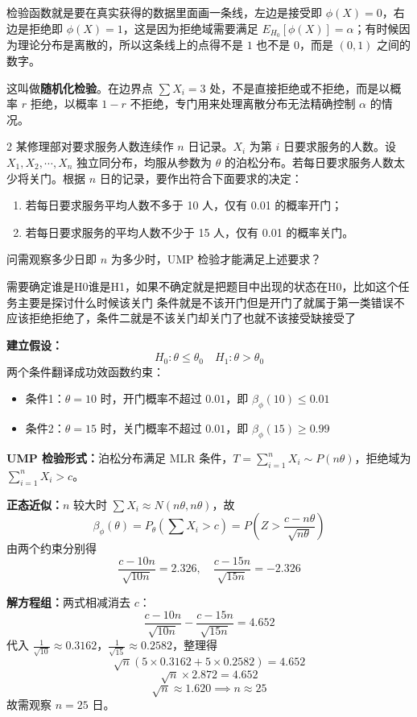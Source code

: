\begin{dxtips}
    检验函数就是要在真实获得的数据里面画一条线，左边是接受即 $\phi(X)=0$，右边是拒绝即 $\phi(X)=1$，这是因为拒绝域需要满足 $E_{H_0}[\phi(X)]=\alpha$；有时候因为理论分布是离散的，所以这条线上的点得不是 $1$ 也不是 $0$，而是 $(0,1)$ 之间的数字。
\end{dxtips}
\begin{dxtips}
    这叫做\textbf{随机化检验}。在边界点 $\sum X_i = 3$ 处，不是直接拒绝或不拒绝，而是以概率 $r$ 拒绝，以概率 $1-r$ 不拒绝，专门用来处理离散分布无法精确控制 $\alpha$ 的情况。
\end{dxtips}
\begin{homework}{2}
某修理部对要求服务人数连续作 $n$ 日记录。$X_i$ 为第 $i$ 日要求服务的人数。设 $X_1, X_2, \cdots, X_n$ 独立同分布，均服从参数为 $\theta$ 的泊松分布。若每日要求服务人数太少将关门。根据 $n$ 日的记录，要作出符合下面要求的决定：
\begin{enumerate}
    \item 若每日要求服务平均人数不多于 10 人，仅有 0.01 的概率开门；
    \item 若每日要求服务的平均人数不少于 15 人，仅有 0.01 的概率关门。
\end{enumerate}
问需观察多少日即 $n$ 为多少时，UMP 检验才能满足上述要求？
\end{homework}
\begin{dxtips}
    需要确定谁是H0谁是H1，如果不确定就是把题目中出现的状态在H0，比如这个任务主要是探讨什么时候该关门
   条件就是不该开门但是开门了就属于第一类错误不应该拒绝拒绝了，条件二就是不该关门却关门了也就不该接受缺接受了
\end{dxtips}
\begin{solution}
\textbf{建立假设：}
$$H_0: \theta \leq \theta_0 \quad H_1: \theta > \theta_0$$
两个条件翻译成功效函数约束：
\begin{itemize}
    \item 条件1：$\theta = 10$ 时，开门概率不超过 $0.01$，即 $\beta_\phi(10) \leq 0.01$
    \item 条件2：$\theta = 15$ 时，关门概率不超过 $0.01$，即 $\beta_\phi(15) \geq 0.99$
\end{itemize}

\textbf{UMP 检验形式：}泊松分布满足 MLR 条件，$T = \sum_{i=1}^n X_i \sim P(n\theta)$，拒绝域为 $\sum_{i=1}^n X_i > c$。

\textbf{正态近似：}$n$ 较大时 $\sum X_i \approx N(n\theta, n\theta)$，故
$$\beta_\phi(\theta) = P_\theta\left(\sum X_i > c\right) = P\left(Z > \frac{c - n\theta}{\sqrt{n\theta}}\right)$$
由两个约束分别得
$$\frac{c - 10n}{\sqrt{10n}} = 2.326, \quad \frac{c - 15n}{\sqrt{15n}} = -2.326$$

\textbf{解方程组：}两式相减消去 $c$：
$$\frac{c-10n}{\sqrt{10n}} - \frac{c-15n}{\sqrt{15n}} = 4.652$$
代入 $\frac{1}{\sqrt{10}} \approx 0.3162$，$\frac{1}{\sqrt{15}} \approx 0.2582$，整理得
$$\sqrt{n}\left(5 \times 0.3162 + 5 \times 0.2582\right) = 4.652$$
$$\sqrt{n} \times 2.872 = 4.652$$
$$\sqrt{n} \approx 1.620 \implies n \approx 25$$
故需观察 $n = 25$ 日。
\end{solution}
